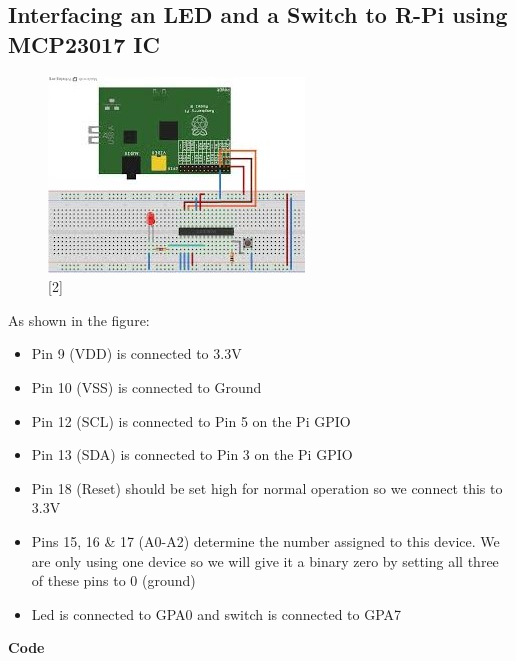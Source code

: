 \documentclass[11pt,a4paper]{article}
\begin{document}
    \newpage
	\subsection{Interfacing an LED and a Switch to R-Pi using MCP23017 IC}
     \begin{figure}[h!]
     	\includegraphics[scale=1.5]{i1.jpeg}
     	\centering
     	\caption{[2]}
     \end{figure} 
     
     As shown in the figure:
     \begin{itemize}
     	\item Pin 9 (VDD) is connected to 3.3V
     	\item Pin 10 (VSS) is connected to Ground
     	\item Pin 12 (SCL) is connected to Pin 5 on the Pi GPIO
     	\item Pin 13 (SDA) is connected to Pin 3 on the Pi GPIO
     	\item Pin 18 (Reset) should be set high for normal operation so we connect this to 3.3V
     	\item Pins 15, 16 \& 17 (A0-A2) determine the number assigned to this device. We are only using one device so we will give it a binary zero by setting all three of these pins to 0 (ground)
     	\item Led is connected to GPA0 and switch is connected to GPA7
     \end{itemize}
    
    \newpage 
    \textbf{Code}
    \vspace{0.3cm}
    
    
    
    \newpage 
\end{document}
